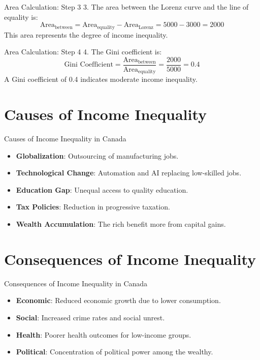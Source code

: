 \documentclass{beamer}
\begin{document}
\begin{frame}{Area Calculation: Step 3}
3. The area between the Lorenz curve and the line of equality is:
\[
\text{Area}_{\text{between}} = \text{Area}_{\text{equality}} - \text{Area}_{\text{Lorenz}} = 5000 - 3000 = 2000
\]
This area represents the degree of income inequality.
\end{frame}

\begin{frame}{Area Calculation: Step 4}
4. The Gini coefficient is:
\[
\text{Gini Coefficient} = \frac{\text{Area}_{\text{between}}}{\text{Area}_{\text{equality}}} = \frac{2000}{5000} = 0.4
\]
A Gini coefficient of 0.4 indicates moderate income inequality.
\end{frame}

\section{Causes of Income Inequality}

\begin{frame}{Causes of Income Inequality in Canada}
\begin{itemize}
    \item \textbf{Globalization}: Outsourcing of manufacturing jobs.
    \item \textbf{Technological Change}: Automation and AI replacing low-skilled jobs.
    \item \textbf{Education Gap}: Unequal access to quality education.
    \item \textbf{Tax Policies}: Reduction in progressive taxation.
    \item \textbf{Wealth Accumulation}: The rich benefit more from capital gains.
\end{itemize}
\end{frame}

\section{Consequences of Income Inequality}

\begin{frame}{Consequences of Income Inequality in Canada}
\begin{itemize}
    \item \textbf{Economic}: Reduced economic growth due to lower consumption.
    \item \textbf{Social}: Increased crime rates and social unrest.
    \item \textbf{Health}: Poorer health outcomes for low-income groups.
    \item \textbf{Political}: Concentration of political power among the wealthy.
\end{itemize}
\end{frame}
\end{document}
